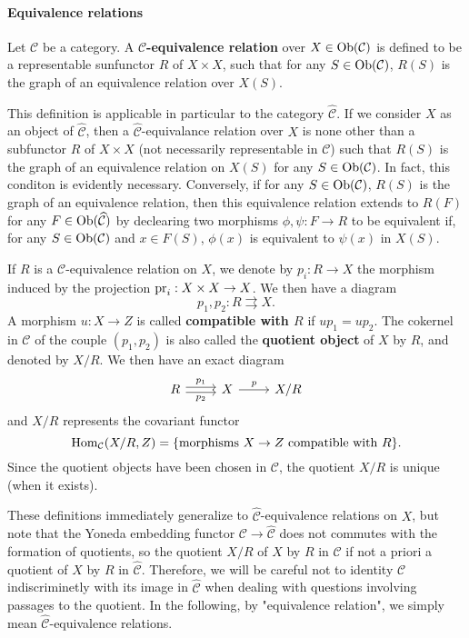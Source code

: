 \paragraph{Equivalence relations}
\begin{definition}
Let $\mathcal{C}$ be a category. A \textbf{$\mathcal{C}$-equivalence relation} over $X\in\mathrm{Ob}(\mathcal{C})$ is defined to be a representable sunfunctor $R$ of $X\times X$, such that for any $S\in\mathrm{Ob}(\mathcal{C})$, $R(S)$ is the graph of an equivalence relation over $X(S)$.
\end{definition}
This definition is applicable in particular to the category $\widehat{\mathcal{C}}$. If we consider $X$ as an object of $\widehat{\mathcal{C}}$, then a $\widehat{\mathcal{C}}$-equivalance relation over $X$ is none other than a subfunctor $R$ of $X\times X$ (not necessarily representable in $\mathcal{C}$) such that $R(S)$ is the graph of an equivalence relation on $X(S)$ for any $S\in\mathrm{Ob}(\mathcal{C})$. In fact, this conditon is evidently necessary. Conversely, if for any $S\in\mathrm{Ob}(\mathcal{C})$, $R(S)$ is the graph of an equivalence relation, then this equivalence relation extends to $R(F)$ for any $F\in\mathrm{Ob}(\widehat{\mathcal{C}})$ by declearing two morphisms $\phi,\psi:F\to R$ to be equivalent if, for any $S\in\mathrm{Ob}(\mathcal{C})$ and $x\in F(S)$, $\phi(x)$ is equivalent to $\psi(x)$ in $X(S)$.\par
If $R$ is a $\mathcal{C}$-equivalence relation on $X$, we denote by $p_i:R\to X$ the morphism induced by the projection $\mathrm{pr}_i:X\times X\to X$. We then have a diagram
\[p_1,p_2:R\rightrightarrows X.\]
A morphism $u:X\to Z$ is called \textbf{compatible with $R$} if $up_1=up_2$. The cokernel in $\mathcal{C}$ of the couple $(p_1,p_2)$ is also called the \textbf{quotient object} of $X$ by $R$, and denoted by $X/R$. We then have an exact diagram
\[\begin{tikzcd}
R\ar[r,shift left=2pt,"p_1"]\ar[r,shift right=2pt,swap,"p_2"]&X\ar[r,"p"]&X/R
\end{tikzcd}\]
and $X/R$ represents the covariant functor
\[\mathrm{Hom}_{\mathcal{C}}(X/R,Z)=\{\text{morphisms $X\to Z$ compatible with $R$}\}.\]
Since the quotient objects have been chosen in $\mathcal{C}$, the quotient $X/R$ is unique (when it exists).\par
These definitions immediately generalize to $\widehat{\mathcal{C}}$-equivalence relations on $X$, but note that the Yoneda embedding functor $\mathcal{C}\to\widehat{\mathcal{C}}$ does not commutes with the formation of quotients, so the quotient $X/R$ of $X$ by $R$ in $\mathcal{C}$ if not a priori a quotient of $X$ by $R$ in $\widehat{\mathcal{C}}$. Therefore, we will be careful not to identity $\mathcal{C}$ indiscriminetly with its image in $\widehat{\mathcal{C}}$ when dealing with questions involving passages to the quotient. In the following, by "equivalence relation", we simply mean $\widehat{\mathcal{C}}$-equivalence relations.\par

